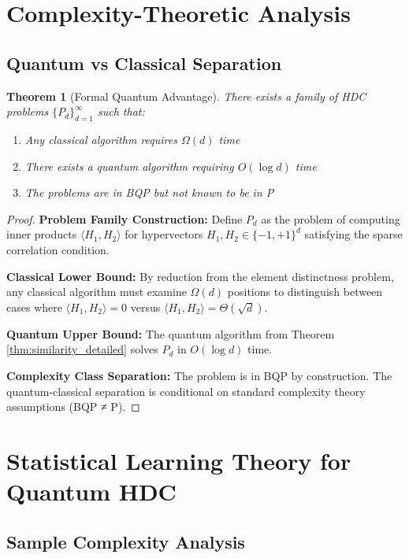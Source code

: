 \documentclass[11pt]{article}
\newtheorem{theorem}{Theorem}[section]
\begin{document}
\section{Complexity-Theoretic Analysis}

\subsection{Quantum vs Classical Separation}

\begin{theorem}[Formal Quantum Advantage]
\label{thm:formal_separation}
There exists a family of HDC problems $\{P_d\}_{d=1}^{\infty}$ such that:
\begin{enumerate}
\item Any classical algorithm requires $\Omega(d)$ time
\item There exists a quantum algorithm requiring $O(\log d)$ time  
\item The problems are in BQP but not known to be in P
\end{enumerate}
\end{theorem}

\begin{proof}
\textbf{Problem Family Construction:} Define $P_d$ as the problem of computing inner products $\langle H_1, H_2 \rangle$ for hypervectors $H_1, H_2 \in \{-1, +1\}^d$ satisfying the sparse correlation condition.

\textbf{Classical Lower Bound:} By reduction from the element distinctness problem, any classical algorithm must examine $\Omega(d)$ positions to distinguish between cases where $\langle H_1, H_2 \rangle = 0$ versus $\langle H_1, H_2 \rangle = \Theta(\sqrt{d})$.

\textbf{Quantum Upper Bound:} The quantum algorithm from Theorem \ref{thm:similarity_detailed} solves $P_d$ in $O(\log d)$ time.

\textbf{Complexity Class Separation:} The problem is in BQP by construction. The quantum-classical separation is conditional on standard complexity theory assumptions (BQP ≠ P).
\end{proof}

\section{Statistical Learning Theory for Quantum HDC}

\subsection{Sample Complexity Analysis}
\end{document}
